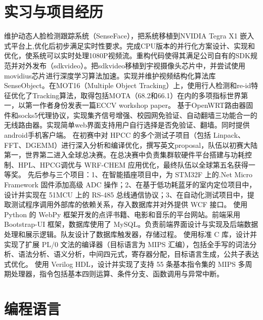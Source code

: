 \documentclass[11pt,a4paper]{moderncv}
\begin{document}
\section{实习与项目经历}
{维护动态人脸检测跟踪系统（SenseFace），把系统移植到NVIDIA Tegra X1 嵌入式平台上,优化后初步满足实时性要求。完成CPU版本的并行化方案设计、实现和优化，使系统可以实时处理1080P视频流。重构代码使得其满足公司自有的SDK规范并对外发布（sdkvideo）。把sdkvideo移植到宇视摄像头芯片中，并尝试使用movidius芯片进行深度学习算法加速。实现并维护视频结构化算法库SenseObject。在MOT16（Multiple Object Tracking）上，使用行人检测和re-id特征优化了Tracking算法，取得包括MOTA（68.2和66.1）在内的多项指标世界第一，以第一作者身份发表一篇ECCV workshop paper。}  
{基于OpenWRT路由器固件和socks5代理协议，实现集齐信号增强、校园网免验证、自动翻墙三功能合一的无线路由器。实现简单web界面支持用户自行选择是否免验证、翻墙。同时提供android手机客户端。}
{在初赛中对 HPCC 的多个测试子项目（包括 Linpack、FFT、DGEMM）进行深入分析和编译优化，撰写英文proposal，队伍以初赛大陆第一，世界第二进入全球总决赛。在总决赛中负责集群软硬件平台搭建与功耗控制、HPL、HPCG调优与 WRF-CHEM 应用优化，最终队伍以全球第五名获得一等奖。} 
{先后参与三个项目：1、在智能插座项目中，为 STM32F 上的.Net Micro Framework 固件添加高级 ADC 操作；2、在基于低功耗蓝牙的室内定位项目中，设计并实现在 51MCU 上的 RS-485 总线通信协议；3、在自动化测试项目中，提取测试程序调用外部库的依赖关系，存入数据库并对外提供 WCF 接口。} 
{使用 Python 的 WebPy 框架开发的点评书籍、电影和音乐的平台网站。前端采用 Bootstrap-UI 框架，数据库使用了 MySQL。负责前端界面设计与实现及后端数据处理和展示逻辑。队友设计了数据库触发器，存储过程。} 
{使用标准 C 库，设计并实现了扩展 PL/0 文法的编译器（目标语言为 MIPS 汇编），包括全手写的词法分析、语法分析、语义分析，中间四元式，寄存器分配，目标语言生成，公共子表达式优化。} 
{使用 Verilog HDL，设计并实现了支持 55 条基本指令集的 MIPS 多周期处理器，指令包括基本四则运算、条件分支、函数调用与异常中断。} 
\section{编程语言}
\end{document}
